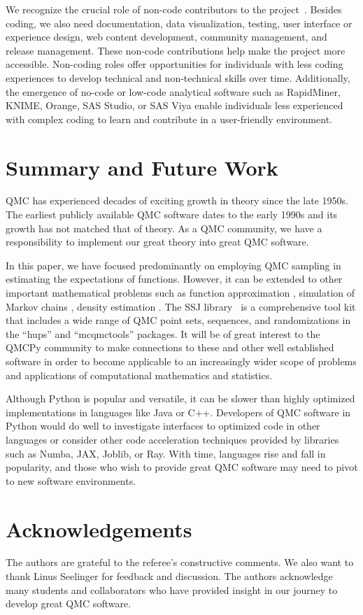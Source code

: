 \documentclass[graybox]{svmult}
\begin{document}
We recognize the crucial role of non-code contributors to the project~\cite{K23}. Besides coding, we also need documentation, data visualization, testing, user interface or experience design, web content development, community management, and release management. These non-code contributions help make the project more  accessible. Non-coding roles offer opportunities for individuals with less coding experiences to develop technical and non-technical skills over time.  Additionally, the emergence of no-code or low-code analytical software such as RapidMiner, KNIME, Orange, SAS Studio, or SAS Viya enable individuals less experienced with complex coding to learn and contribute in a user-friendly environment.


\section{Summary and Future Work}
QMC has experienced decades of exciting growth in theory since the late 1950s.  The earliest publicly available QMC software dates to the early 1990s and its growth has not matched that of theory.  As a QMC community, we have a responsibility to implement our great theory into great QMC software.

In this paper, we have focused predominantly on employing QMC sampling in estimating the expectations of functions. However, it can be extended to other important mathematical problems such as function approximation \cite{Kmmerer2015, PotSch21}, simulation of Markov chains \cite{l2018sorting,puchhammer2021variance},  density estimation \cite{LEcuyer2022b}.
The SSJ library~\cite{l2002ssj} is a comprehensive tool kit that includes a wide range of QMC point sets, sequences, and randomizations in the ``hups'' and ``mcqmctools'' packages. It will be of great interest to the QMCPy community to make connections to these and other well established software in order to become applicable to an increasingly wider scope of problems and applications of computational mathematics and statistics.

Although Python is popular and versatile, it can be slower than highly optimized implementations in languages like Java or C++.  Developers of QMC software in Python would do well to investigate interfaces to optimized code in other languages or consider other code acceleration techniques provided by libraries such as Numba, JAX, Joblib, or Ray.  With time, languages rise and fall in popularity, and those who wish to provide great QMC software may need to pivot to new software environments.


\section*{Acknowledgements}
The authors are grateful to the referee's constructive comments. We also want to thank Linus Seelinger for feedback and discussion. The authors acknowledge many students and collaborators who have provided insight in our journey to develop great QMC software.




\end{document}
